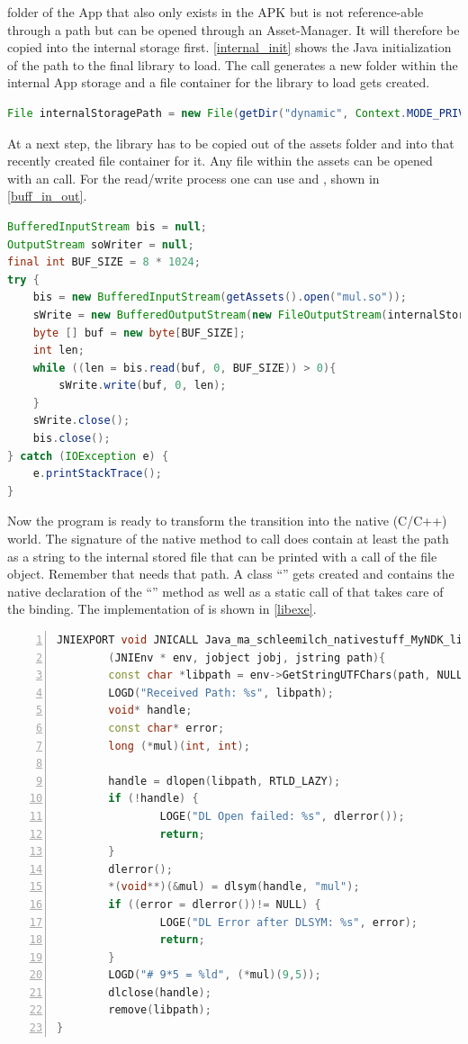  folder of the App that also only exists in the APK but is not
reference-able through a path but can be opened through an Asset-Manager. It will therefore be copied into the internal storage first. \autoref{internal_init} shows the Java initialization of the path to the final library to load. The  call generates a new folder within the internal App storage and a file container for the library to load gets created.
\begin{lstlisting}[language=Java, caption=Internal Storage Initialization, label=internal_init]
File internalStoragePath = new File(getDir("dynamic", Context.MODE_PRIVATE), "mul.so");
\end{lstlisting}
At a next step, the library has to be copied out of the assets folder and into that
recently created file container for it. Any file within the assets can be opened with an
 call. For the read/write process one can use
 and , shown in
\autoref{buff_in_out}.
\begin{lstlisting}[language=Java, caption=Buffered Input/Output, label=buff_in_out]
BufferedInputStream bis = null;
OutputStream soWriter = null;
final int BUF_SIZE = 8 * 1024;
try {
    bis = new BufferedInputStream(getAssets().open("mul.so"));
    sWrite = new BufferedOutputStream(new FileOutputStream(internalStoragePath));
    byte [] buf = new byte[BUF_SIZE];
    int len;
    while ((len = bis.read(buf, 0, BUF_SIZE)) > 0){
        sWrite.write(buf, 0, len);
    }
    sWrite.close();
    bis.close();
} catch (IOException e) {
    e.printStackTrace();
}
\end{lstlisting}
Now the program is ready to transform the transition into the native (C/C++) world.
The signature of the native method to call does contain at least the path as a string to
the internal stored file that can be printed with a  call of the
 file object. Remember that  needs that path.
A class ``'' gets created and contains the native declaration of the
``'' method as well as a static call of
 that takes care of the binding.
The implementation of  is shown in \autoref{libexe}.
\begin{lstlisting}[language=C++, caption=Native libExe(), label=libexe, numbers=left]
JNIEXPORT void JNICALL Java_ma_schleemilch_nativestuff_MyNDK_libExe
        (JNIEnv * env, jobject jobj, jstring path){
        const char *libpath = env->GetStringUTFChars(path, NULL);
        LOGD("Received Path: %s", libpath);
        void* handle;
        const char* error;
        long (*mul)(int, int);

        handle = dlopen(libpath, RTLD_LAZY);
        if (!handle) {
                LOGE("DL Open failed: %s", dlerror());
                return;
        }
        dlerror();
        *(void**)(&mul) = dlsym(handle, "mul");
        if ((error = dlerror())!= NULL) {
                LOGE("DL Error after DLSYM: %s", error);
                return;
        }
        LOGD("# 9*5 = %ld", (*mul)(9,5));
        dlclose(handle);
        remove(libpath);
}
\end{lstlisting}
